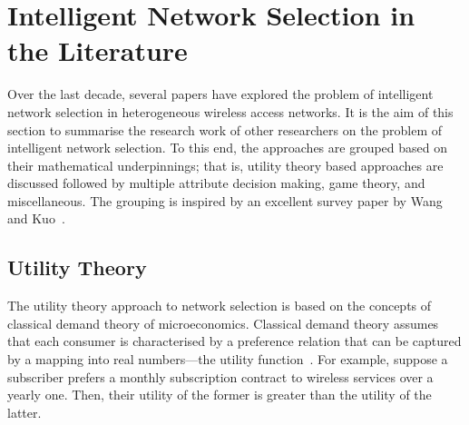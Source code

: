 \section{Intelligent Network Selection in the Literature} %
\label{sec:intelligent_network_selection_in_the_literature_intelligent}
Over the last decade, several papers have explored the problem of intelligent network selection in heterogeneous wireless access networks. It is the aim of this section to summarise the research work of other researchers on the problem of intelligent network selection. To this end, the approaches are grouped based on their mathematical underpinnings; that is, utility theory based approaches are discussed followed by multiple attribute decision making, game theory, and miscellaneous. The grouping is inspired by an excellent survey paper by Wang and Kuo~\cite{LushengKuo2013}.

\subsection{Utility Theory} %
\label{sub:utility_theory_intelligent}
The utility theory approach to network selection is based on the concepts of classical demand theory of microeconomics. Classical demand theory assumes that each consumer is characterised by a preference relation that can be captured by a mapping into real numbers---the utility function~\cite{MicroTheory}. For example, suppose a subscriber prefers a monthly subscription contract to wireless services over a yearly one. Then, their utility of the former is greater than the utility of the latter.

